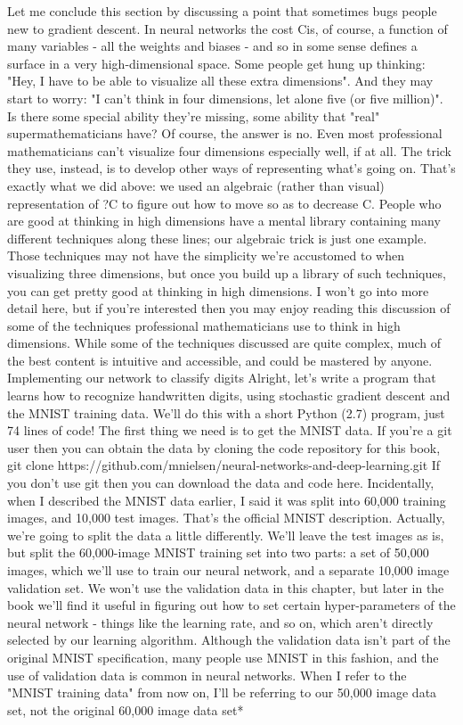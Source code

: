 Let me conclude this section by discussing a point that sometimes bugs people new to gradient descent. In neural networks the cost Cis, of course, a function of many variables - all the weights and biases - and so in some sense defines a surface in a very high-dimensional space. Some people get hung up thinking: "Hey, I have to be able to visualize all these extra dimensions". And they may start to worry: "I can't think in four dimensions, let alone five (or five million)". Is there some special ability they're missing, some ability that "real" supermathematicians have? Of course, the answer is no. Even most professional mathematicians can't visualize four dimensions especially well, if at all. The trick they use, instead, is to develop other ways of representing what's going on. That's exactly what we did above: we used an algebraic (rather than visual) representation of ?C to figure out how to move so as to decrease C. People who are good at thinking in high dimensions have a mental library containing many different techniques along these lines; our algebraic trick is just one example. Those techniques may not have the simplicity we're accustomed to when visualizing three dimensions, but once you build up a library of such techniques, you can get pretty good at thinking in high dimensions. I won't go into more detail here, but if you're interested then you may enjoy reading this discussion of some of the techniques professional mathematicians use to think in high dimensions. While some of the techniques discussed are quite complex, much of the best content is intuitive and accessible, and could be mastered by anyone.
Implementing our network to classify digits
Alright, let's write a program that learns how to recognize handwritten digits, using stochastic gradient descent and the MNIST training data. We'll do this with a short Python (2.7) program, just 74 lines of code! The first thing we need is to get the MNIST data. If you're a git user then you can obtain the data by cloning the code repository for this book,
git clone https://github.com/mnielsen/neural-networks-and-deep-learning.git
If you don't use git then you can download the data and code here.
Incidentally, when I described the MNIST data earlier, I said it was split into 60,000 training images, and 10,000 test images. That's the official MNIST description. Actually, we're going to split the data a little differently. We'll leave the test images as is, but split the 60,000-image MNIST training set into two parts: a set of 50,000 images, which we'll use to train our neural network, and a separate 10,000 image validation set. We won't use the validation data in this chapter, but later in the book we'll find it useful in figuring out how to set certain hyper-parameters of the neural network - things like the learning rate, and so on, which aren't directly selected by our learning algorithm. Although the validation data isn't part of the original MNIST specification, many people use MNIST in this fashion, and the use of validation data is common in neural networks. When I refer to the "MNIST training data" from now on, I'll be referring to our 50,000 image data set, not the original 60,000 image data set* 


